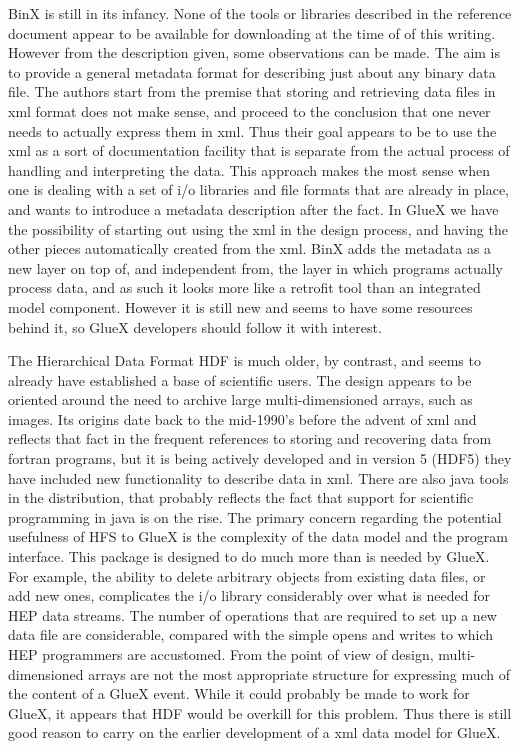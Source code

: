 \documentclass[10pt]{article}
\begin{document}
BinX is still in its infancy.  None of the tools or libraries described
in the reference document appear to be available for downloading at the
time of of this writing.  However from the description given, some
observations can be made.  The aim is to provide a general metadata format
for describing just about any binary data file.  The authors start from
the premise that storing and retrieving data files in xml format does not
make sense, and proceed to the conclusion that one never needs to actually
express them in xml.  Thus their goal appears to be to use the xml as a
sort of documentation facility that is separate from the actual process
of handling and interpreting the data.  This approach makes the most sense
when one is dealing with a set of i/o libraries and file formats that are
already in place, and wants to introduce a metadata description after the
fact.  In GlueX we have the possibility of starting out using the xml in
the design process, and having the other pieces automatically created from
the xml. BinX adds the metadata as a new layer on top of, and independent
from, the layer in which programs actually process data, and as such it
looks more like a retrofit tool than an integrated model component.
However it is still new and seems to have some resources behind it, so
GlueX developers should follow it with interest.

The Hierarchical Data Format HDF is much older, by contrast, and seems to
already have established a base of scientific users.  The design appears
to be oriented around the need to archive large multi-dimensioned arrays,
such as images.  Its origins date back to the mid-1990's before the advent
of xml and reflects that fact in the frequent references to storing and
recovering data from fortran programs, but it is being actively developed
and in version 5 (HDF5) they have included new functionality to describe
data in xml.  There are also java tools in the distribution, that probably
reflects the fact that support for scientific programming in java is on the
rise.  The primary concern regarding the potential usefulness of HFS to
GlueX is the complexity of the data model and the program interface.
This package is designed to do much more than is needed by GlueX.  For
example, the ability to delete arbitrary objects from existing data files,
or add new ones, complicates the i/o library considerably over what is
needed for HEP data streams.  The number of operations that are required
to set up a new data file are considerable, compared with the simple
opens and writes to which HEP programmers are accustomed.  From the point
of view of design, multi-dimensioned arrays are not the most appropriate
structure for expressing much of the content of a GlueX event.  While it
could probably be made to work for GlueX, it appears that HDF would be
overkill for this problem.  Thus there is still good reason to carry on
the earlier development of a xml data model for GlueX.
\end{document}
